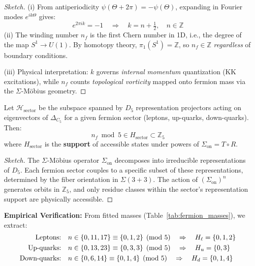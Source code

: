 \documentclass[12pt]{article}
\begin{document}
\begin{proof}[Sketch]
(i) From antiperiodicity $\psi(\Theta + 2\pi) = -\psi(\Theta)$, expanding in Fourier modes $e^{ik\Theta}$ gives:
\[
e^{2\pi i k} = -1 \quad \Rightarrow \quad k = n + \tfrac{1}{2}, \quad n \in \mathbb{Z}
\]
(ii) The winding number $n_f$ is the first Chern number in 1D, i.e., the degree of the map $S^1 \to U(1)$. By homotopy theory, $\pi_1(S^1) = \mathbb{Z}$, so $n_f \in \mathbb{Z}$ \emph{regardless} of boundary conditions.

(iii) Physical interpretation: $k$ governs \emph{internal momentum} quantization (KK excitations), while $n_f$ counts \emph{topological vorticity} mapped onto fermion mass via the $\Sigma$-M\"obius geometry.
\end{proof}

\begin{lemma}
\label{lem:dihedral_selection}
Let $\mathcal{H}_{\text{sector}}$ be the subspace spanned by $D_5$ representation projectors acting on eigenvectors of $\Delta_{C_5}$ for a given fermion sector (leptons, up-quarks, down-quarks). Then:
\begin{equation}
\boxed{n_f \bmod 5 \in H_{\text{sector}} \subset \mathbb{Z}_5}
\end{equation}
where $H_{\text{sector}}$ is the \textbf{support} of accessible states under powers of $\Sigma_{\text{on}} = T \circ R$.
\end{lemma}

\begin{proof}[Sketch]
The $\Sigma$-M\"obius operator $\Sigma_{\text{on}}$ decomposes into irreducible representations of $D_5$. Each fermion sector couples to a specific subset of these representations, determined by the fiber orientation in $\Sigma(3+3)$. The action of $(\Sigma_{\text{on}})^n$ generates orbits in $\mathbb{Z}_5$, and only residue classes within the sector's representation support are physically accessible.
\end{proof}

\textbf{Empirical Verification:} From fitted masses (Table~\ref{tab:fermion_masses}), we extract:
\begin{align}
\text{Leptons:} \quad &n \in \{0, 11, 17\} \equiv \{0, 1, 2\} \pmod{5} \quad \Rightarrow \quad H_\ell = \{0, 1, 2\} \notag \\
\text{Up-quarks:} \quad &n \in \{0, 13, 23\} \equiv \{0, 3, 3\} \pmod{5} \quad \Rightarrow \quad H_u = \{0, 3\} \notag \\
\text{Down-quarks:} \quad &n \in \{0, 6, 14\} \equiv \{0, 1, 4\} \pmod{5} \quad \Rightarrow \quad H_d = \{0, 1, 4\} \notag
\end{align}
\end{document}
